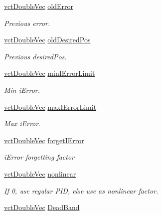 \begin{DoxyCompactItemize}
\hyperlink{vct_dynamic_vector_types_8h_ade4b3068c86fb88f41af2e5187e491c2}{vct\+Double\+Vec} \hyperlink{classmts_p_i_d_ad9b05536756b06bd08374606fa615dc6}{old\+Error}
\begin{DoxyCompactList}\small\item\em Previous error. \end{DoxyCompactList}\item 
\hyperlink{vct_dynamic_vector_types_8h_ade4b3068c86fb88f41af2e5187e491c2}{vct\+Double\+Vec} \hyperlink{classmts_p_i_d_a9bd5876d1e7062eafd4dde4e2914adab}{old\+Desired\+Pos}
\begin{DoxyCompactList}\small\item\em Previous desired\+Pos. \end{DoxyCompactList}\item 
\hyperlink{vct_dynamic_vector_types_8h_ade4b3068c86fb88f41af2e5187e491c2}{vct\+Double\+Vec} \hyperlink{classmts_p_i_d_af87166f1f4a9f13c732be381f000d32a}{min\+I\+Error\+Limit}
\begin{DoxyCompactList}\small\item\em Min i\+Error. \end{DoxyCompactList}\item 
\hyperlink{vct_dynamic_vector_types_8h_ade4b3068c86fb88f41af2e5187e491c2}{vct\+Double\+Vec} \hyperlink{classmts_p_i_d_a15180d5531a92d2bd2d9ced43496165e}{max\+I\+Error\+Limit}
\begin{DoxyCompactList}\small\item\em Max i\+Error. \end{DoxyCompactList}\item 
\hyperlink{vct_dynamic_vector_types_8h_ade4b3068c86fb88f41af2e5187e491c2}{vct\+Double\+Vec} \hyperlink{classmts_p_i_d_a030332a1f4dead8460baeb6693c76195}{forget\+I\+Error}
\begin{DoxyCompactList}\small\item\em i\+Error forgetting factor \end{DoxyCompactList}\item 
\hyperlink{vct_dynamic_vector_types_8h_ade4b3068c86fb88f41af2e5187e491c2}{vct\+Double\+Vec} \hyperlink{classmts_p_i_d_a999fa0d68f5e49a7d26a9cf60ee738c7}{nonlinear}
\begin{DoxyCompactList}\small\item\em If 0, use regular P\+I\+D, else use as nonlinear factor. \end{DoxyCompactList}\item 
\hyperlink{vct_dynamic_vector_types_8h_ade4b3068c86fb88f41af2e5187e491c2}{vct\+Double\+Vec} \hyperlink{classmts_p_i_d_a1af99beeae2d49d92974919056a62c48}{Dead\+Band}

\end{DoxyCompactItemize}
